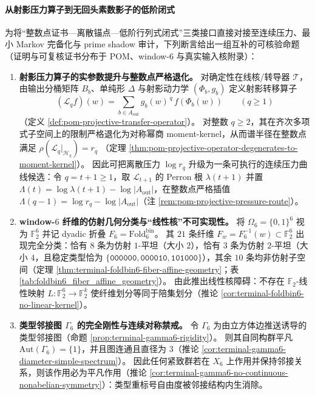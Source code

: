 \paragraph{从射影压力算子到无回头素数影子的低阶闭式}
为将“整数点证书—离散锚点—低阶行列式闭式”三类接口直接对接至连续压力、最小 Markov 完备化与 prime shadow 审计，下列断言给出一组互补的可核验命题（证明与可复核证书分布于 POM、window-\(6\) 与真实输入核附录）：
\begin{enumerate}
  \item \textbf{射影压力算子的实参数提升与整数点严格退化。}
  对确定性在线核/转导器 \(\mathcal{T}\)，由输出分桶矩阵 \(B_b\)、单纯形 \(\Delta\) 与射影动力学 \((\Phi_b,g_b)\) 定义射影转移算子
  \[
  (\mathcal{L}_q f)(w)=\sum_{b\in A_{\mathrm{out}}} g_b(w)^{\,q}\,f(\Phi_b(w))\qquad (q\ge 1)
  \]
  （定义 \ref{def:pom-projective-transfer-operator}）。
  对整数 \(q\ge 2\)，其在齐次多项式子空间上的限制严格退化为对称幂商 moment-kernel，从而谱半径在整数点满足
  \(
  \rho(\mathcal{L}_q|_{\mathcal{H}_q})=r_q
  \)
  （定理 \ref{thm:pom-projective-operator-degenerates-to-moment-kernel}）。
  因此可把离散压力 \(\log r_q\) 升级为一条可执行的连续压力曲线候选：令 \(q=t+1\ge 1\)，取 \(\mathcal{L}_{t+1}\) 的 Perron 根 \(\lambda(t+1)\) 并置 \(\Lambda(t)=\log\lambda(t+1)-\log|A_{\mathrm{out}}|\)，在整数点严格插值 \(\Lambda(q-1)=\log r_q-\log|A_{\mathrm{out}}|\)（注 \ref{rem:pom-projective-pressure-route}）。

  \item \textbf{window-\(6\) 纤维的仿射几何分类与“线性核”不可实现性。}
  将 \(\Omega_6=\{0,1\}^6\) 视为 \(\mathbb{F}_2^6\) 并记 dyadic 折叠 \(F_6=\mathrm{Fold}^{\mathrm{bin}}_6\)。
  其 \(21\) 条纤维 \(F_w=F_6^{-1}(w)\subset\mathbb{F}_2^6\) 出现完全分类：恰有 \(8\) 条为仿射 \(1\)-平坦（大小 \(2\)），恰有 \(3\) 条为仿射 \(2\)-平坦（大小 \(4\)，且稳定类型恰为 \(\{\texttt{000000},\texttt{000010},\texttt{101000}\}\)），其余 \(10\) 条均非仿射子空间（定理 \ref{thm:terminal-foldbin6-fiber-affine-geometry}；表 \ref{tab:foldbin6_fiber_affine_geometry}）。
  由此推出线性核障碍：不存在 \(\mathbb{F}_2\)-线性映射 \(L:\mathbb{F}_2^6\to\mathbb{F}_2^k\) 使纤维划分等同于陪集划分（推论 \ref{cor:terminal-foldbin6-no-linear-kernel}）。

  \item \textbf{类型邻接图 \texorpdfstring{$\Gamma_6$}{Gamma6} 的完全刚性与连续对称禁戒。}
  令 \(\Gamma_6\) 为由立方体边推送诱导的类型邻接图（命题 \ref{prop:terminal-gamma6-rigidity}）。
  则其自同构群平凡 \(\mathrm{Aut}(\Gamma_6)=\{1\}\)，并且图连通且直径为 \(3\)（推论 \ref{cor:terminal-gamma6-diameter-simple-spectrum}）。
  因此任何紧致群若在 \(X_6\) 上作用并保持邻接关系，则该作用必为平凡作用（推论 \ref{cor:terminal-gamma6-no-continuous-nonabelian-symmetry}）：类型重标号自由度被邻接结构内生消除。


\end{enumerate}
